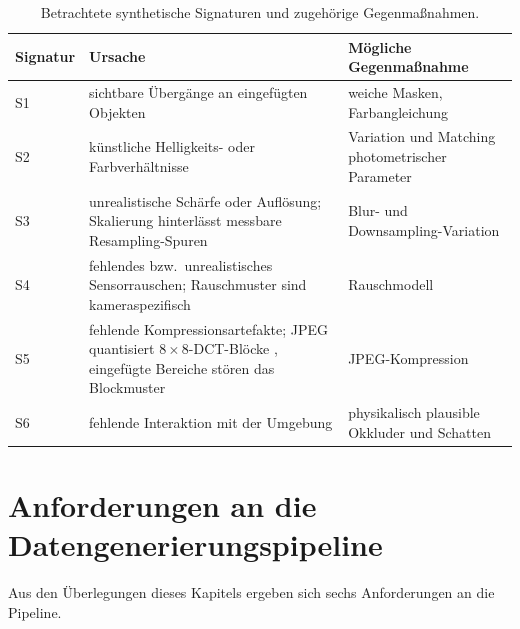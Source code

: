 \begin{table}[htbp]
  \centering
  \caption{Betrachtete synthetische Signaturen und zugehörige Gegenmaßnahmen.}
  \label{tab:signaturen}
  \small
  \begin{tabularx}{\linewidth}{@{}l X X@{}}
    \toprule
    \textbf{Signatur} & \textbf{Ursache} & \textbf{Mögliche Gegenmaßnahme} \\
    \midrule
    S1 & sichtbare Übergänge an eingefügten Objekten
       & weiche Masken, Farbangleichung \\
    S2 & künstliche Helligkeits- oder Farbverhältnisse
         \parencite{reinhard2001,tsai2017}
       & Variation und Matching photometrischer Parameter \\
    S3 & unrealistische Schärfe oder Auflösung; Skalierung hinterlässt
         messbare Resampling-Spuren \parencite{popescu2005,zhangr2019}
       & Blur- und Downsampling-Variation \\
    S4 & fehlendes bzw.\ unrealistisches Sensorrauschen; Rauschmuster sind
         kameraspezifisch \parencite{lukas2006}
       & Rauschmodell \\
    S5 & fehlende Kompressionsartefakte; JPEG quantisiert $8\times8$-DCT-Blöcke
         \parencite{wallace1992jpeg}, eingefügte Bereiche stören das Blockmuster
         \parencite{farid2009}
       & JPEG-Kompression \\
    S6 & fehlende Interaktion mit der Umgebung
       & physikalisch plausible Okkluder und Schatten \\
    \bottomrule
  \end{tabularx}
\end{table}

\section{Anforderungen an die Datengenerierungspipeline}
\label{sec:anforderungen}

Aus den Überlegungen dieses Kapitels ergeben sich sechs Anforderungen an die
Pipeline.

